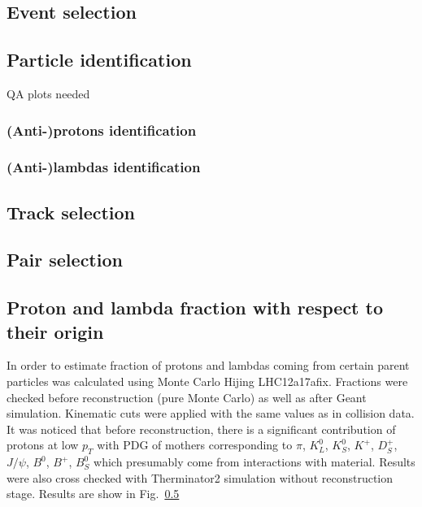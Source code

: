 \documentclass[ALICE,manyauthors]{ALICE_analysis_notes}
\begin{document}
\subsection{Event selection}

\subsection{Particle identification}
QA plots needed

\subsubsection{(Anti-)protons identification}

\subsubsection{(Anti-)lambdas identification}

\subsection{Track selection}

\subsection{Pair selection}

\subsection{Proton and lambda fraction with respect to their origin}
In order to estimate fraction of protons and lambdas coming from certain parent particles was calculated using Monte Carlo Hijing LHC12a17afix. Fractions were checked before reconstruction (pure Monte Carlo) as well as after Geant simulation. Kinematic cuts were applied with the same values as in collision data. It was noticed that before reconstruction, there is a significant contribution of protons at low $p_{T}$  with PDG of mothers corresponding to $\pi$, $K^0_L$, $K^0_S$, $K^+$, $D^+_S$, $J/\psi$, $B^0$, $B^+$, $B^0_S$ which presumably come from interactions with material. Results were also cross checked with Therminator2 simulation without reconstruction stage. Results are show in Fig.~\ref{}
\end{document}
